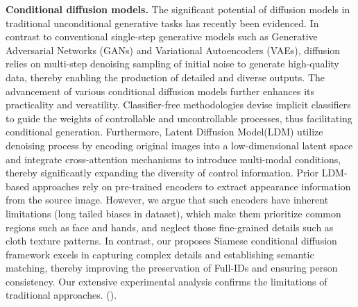 \textbf{Conditional diffusion models.}
The significant potential of diffusion models in traditional unconditional generative tasks has recently been evidenced\cite{ho2020denoising,song2020denoising,song2020score}. 
In contrast to conventional single-step generative models such as Generative Adversarial Networks (GANs)\cite{mirza2014conditional} and Variational Autoencoders (VAEs)\cite{kingma2013auto}, diffusion relies on multi-step denoising sampling of initial noise to generate high-quality data, thereby enabling the production of detailed and diverse outputs. The advancement of various conditional diffusion models further enhances its practicality and versatility. Classifier-free methodologies devise implicit classifiers to guide the weights of controllable and uncontrollable processes, thus facilitating conditional generation\cite{ho2022classifier}. Furthermore, Latent Diffusion Model(LDM)\cite{rombach2022high} utilize denoising process by encoding original images into a low-dimensional latent space and integrate cross-attention mechanisms to introduce multi-modal conditions, thereby significantly expanding the diversity of control information. 
Prior LDM-based approaches\cite{han2023controllable,shen2024advancing,lu2024coarse} rely on pre-trained encoders to extract appearance information from the source image. However, we argue that such encoders have inherent limitations (\ie long tailed biases in dataset), which make them prioritize common regions such as face and hands, and neglect those fine-grained details such as cloth texture patterns.
In contrast, our proposes Siamese conditional diffusion framework excels in capturing complex details and establishing semantic matching, thereby improving the preservation of Full-IDs and ensuring person consistency. Our extensive experimental analysis confirms the limitations of traditional approaches. ().
